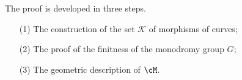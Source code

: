 \documentclass[a4paper,11pt]{amsart}
\begin{document}
{ 						The proof is developed in three steps.
 						\begin{itemize}
 							\item[(1)] The construction of the set $\mathscr{K}$ of morphisms of curves;
 							\item[(2)] The proof of the finitness of the monodromy group $G;$
 							\item[(3)] The geometric description of $\cM.$ 
 							\end{itemize}
 						
 
}
\end{document}
